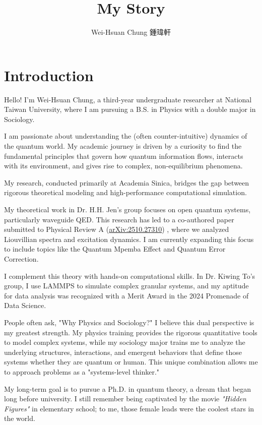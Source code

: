 \documentclass[11pt,a4paper]{article}
\title{My Story}
\author{Wei-Hsuan Chung 鍾瑋軒}
\date{}
\begin{document}
\maketitle
\section*{Introduction}

Hello! I'm Wei-Hsuan Chung, a third-year undergraduate researcher at National Taiwan University, where I am pursuing a B.S. in Physics with a double major in Sociology.

I am passionate about understanding the (often counter-intuitive) dynamics of the quantum world. My academic journey is driven by a curiosity to find the fundamental principles that govern how quantum information flows, interacts with its environment, and gives rise to complex, non-equilibrium phenomena.

My research, conducted primarily at Academia Sinica, bridges the gap between rigorous theoretical modeling and high-performance computational simulation.

My theoretical work in Dr. H.H. Jen's group focuses on open quantum systems, particularly waveguide QED. This research has led to a co-authored paper submitted to Physical Review A (\href{https://arxiv.org/abs/2510.27310}{arXiv:2510.27310}) , where we analyzed Liouvillian spectra and excitation dynamics. I am currently expanding this focus to include topics like the Quantum Mpemba Effect and Quantum Error Correction.

I complement this theory with hands-on computational skills. In Dr. Kiwing To's group, I use LAMMPS to simulate complex granular systems, and my aptitude for data analysis was recognized with a Merit Award in the 2024 Promenade of Data Science.

People often ask, "Why Physics and Sociology?" I believe this dual perspective is my greatest strength. My physics training provides the rigorous quantitative tools to model complex systems, while my sociology major trains me to analyze the underlying structures, interactions, and emergent behaviors that define those systems whether they are quantum or human. This unique combination allows me to approach problems as a "systems-level thinker."

My long-term goal is to pursue a Ph.D. in quantum theory, a dream that began long before university. I still remember being captivated by the movie \emph{"Hidden Figures"} in elementary school; to me, those female leads were the coolest stars in the world.
\end{document}
